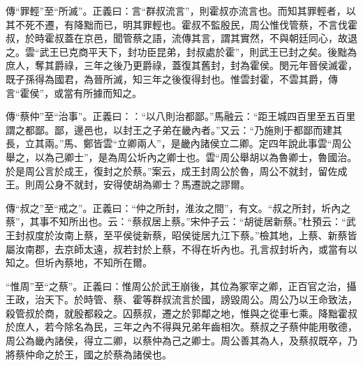 {\noindent\zhuan{}\fzbyks 傳“罪輕”至“所滅”。正義曰：言“群叔流言”，則霍叔亦流言也。而知其罪輕者，以其不死不遷，有降黜而已，明其罪輕也。霍叔不監殷民，周公惟伐管蔡，不言伐霍叔，於時霍叔蓋在京邑，聞管蔡之語，流傳其言，謂其實然，不與朝廷同心，故退之。雲“武王已克商平天下，封功臣昆弟，封叔處於霍”，則武王已封之矣。後黜為庶人，奪其爵祿，三年之後乃更爵祿，蓋復其舊封，封為霍侯。閔元年晉侯滅霍，既子孫得為國君，為晉所滅，知三年之後復得封也。惟雲封霍，不雲其爵，傳言“霍侯”，或當有所據而知之。 \par}

{\noindent\zhuan{}\fzbyks 傳“蔡仲”至“治事”。正義曰：：“以八則治都鄙。”馬融云：“距王城四百里至五百里謂之都鄙。鄙，邊邑也，以封王之子弟在畿內者。”又云：“乃施則于都鄙而建其長，立其兩。”馬、鄭皆雲“立卿兩人”，是畿內諸侯立二卿。定四年說此事雲“周公舉之，以為己卿士”，是為周公圻內之卿士也。雲“周公舉胡以為魯卿士，魯國治。於是周公言於成王，復封之於蔡。”案云，成王封周公於魯，周公不就封，留佐成王。則周公身不就封，安得使胡為卿士？馬遷說之謬爾。 \par}

{\noindent\zhuan{}\fzbyks 傳“叔之”至“戒之”。正義曰：“仲之所封，淮汝之間”，有文。“叔之所封，圻內之蔡”，其事不知所出也。云：“蔡叔居上蔡。”宋仲子云：“胡徙居新蔡。”杜預云：“武王封叔度於汝南上蔡，至平侯徙新蔡，昭侯徙居九江下蔡。”檢其地，上蔡、新蔡皆屬汝南郡，去京師太遠，叔若封於上蔡，不得在圻內也。孔言叔封圻內，或當有以知之。但圻內蔡地，不知所在爾。 \par}

{\noindent\shu{}\fzkt “惟周”至“之蔡”。正義曰：惟周公於武王崩後，其位為冢宰之卿，正百官之治，攝王政，治天下。於時管、蔡、霍等群叔流言於國，謗毀周公。周公乃以王命致法，殺管叔於商，就殷都殺之。囚蔡叔，遷之於郭鄰之地，惟與之從車七乘。降黜霍叔於庶人，若今除名為民，三年之內不得與兄弟年齒相次。蔡叔之子蔡仲能用敬德，周公為畿內諸侯，得立二卿，以蔡仲為己之卿士。周公善其為人，及蔡叔既卒，乃將蔡仲命之於王，國之於蔡為諸侯也。 \par}

